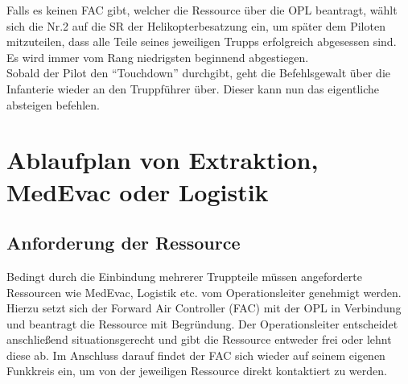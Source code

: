 Falls es keinen FAC gibt, welcher die Ressource über die OPL beantragt, wählt sich die Nr.2  
auf die SR der Helikopterbesatzung ein, um später dem Piloten mitzuteilen, dass alle Teile 
seines jeweiligen Trupps erfolgreich abgesessen sind. Es wird immer vom Rang niedrigsten 
beginnend abgestiegen.\\
Sobald der Pilot den “Touchdown” durchgibt, geht die Befehlsgewalt über die Infanterie 
wieder an den Truppführer über. Dieser kann nun das eigentliche absteigen befehlen.

\section{Ablaufplan von Extraktion, MedEvac oder Logistik}
\subsection{Anforderung der Ressource}
Bedingt durch die Einbindung mehrerer Truppteile müssen angeforderte Ressourcen wie 
MedEvac, Logistik etc. vom Operationsleiter genehmigt werden. Hierzu setzt sich der 
Forward Air Controller (FAC) mit der OPL in Verbindung und beantragt die Ressource mit  
Begründung. Der Operationsleiter entscheidet anschließend situationsgerecht und gibt die 
Ressource entweder frei oder lehnt diese ab. Im Anschluss darauf findet der FAC sich  
wieder auf seinem eigenen Funkkreis ein, um von der jeweiligen Ressource direkt 
kontaktiert zu werden. 

